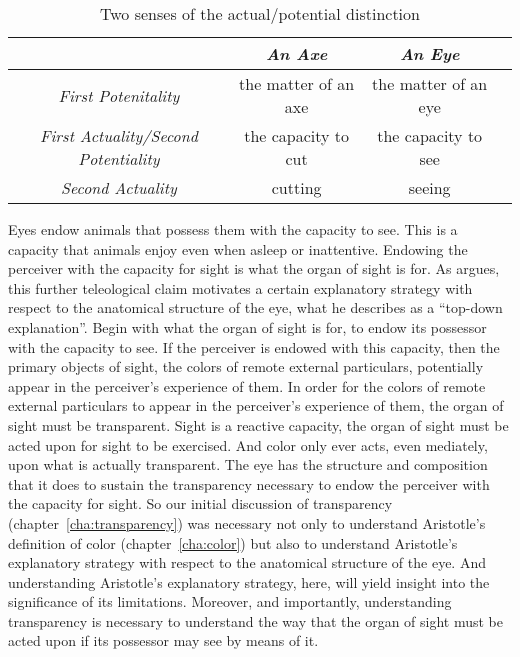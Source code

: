 \begin{table}[htbp]
	\footnotesize
	\centering
		\begin{tabular}{cccc}
			& \emph{An Axe} & \emph{An Eye}\\
			\hline
			\emph{First Potenitality} & the matter of an axe & the matter of an eye\\
			\hline
			\emph{First Actuality/Second Potentiality} & the capacity to cut & the capacity to see\\
			\hline
			\emph{Second Actuality} & cutting & seeing\\
			\hline
		\end{tabular}
	\caption{Two senses of the actual/potential distinction}
	\label{tab:potential}
\end{table}

Eyes endow animals that possess them with the capacity to see. This is a capacity that animals enjoy even when asleep or inattentive. Endowing the perceiver with the capacity for sight is what the organ of sight is for. As \citet{Johansen:1997zr} argues, this further teleological claim motivates a certain explanatory strategy with respect to the anatomical structure of the eye, what he describes as a ``top-down explanation''. Begin with what the organ of sight is for, to endow its possessor with the capacity to see. If the perceiver is endowed with this capacity, then the primary objects of sight, the colors of remote external particulars, potentially appear in the perceiver's experience of them. In order for the colors of remote external particulars to appear in the perceiver's experience of them, the organ of sight must be transparent. Sight is a reactive capacity, the organ of sight must be acted upon for sight to be exercised. And color only ever acts, even mediately, upon what is actually transparent. The eye has the structure and composition that it does to sustain the transparency necessary to endow the perceiver with the capacity for sight. So our initial discussion of transparency (chapter~\ref{cha:transparency}) was necessary not only to understand Aristotle's definition of color (chapter~\ref{cha:color}) but also to understand Aristotle's explanatory strategy with respect to the anatomical structure of the eye. And understanding Aristotle's explanatory strategy, here, will yield insight into the significance of its limitations. Moreover, and importantly, understanding transparency is necessary to understand the way that the organ of sight must be acted upon if its possessor may see by means of it.

